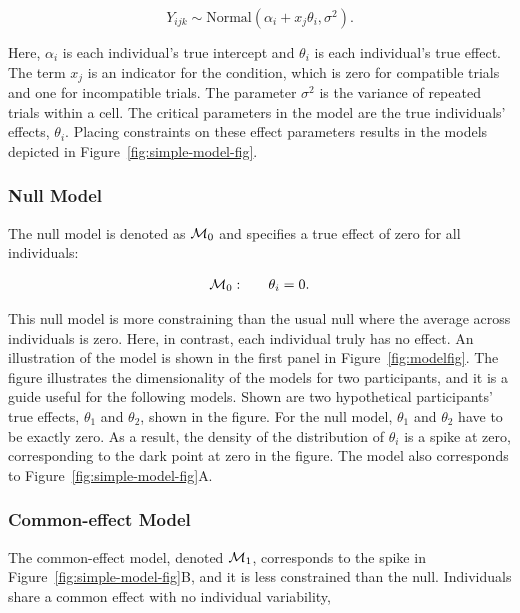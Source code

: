 \documentclass[english,man]{apa6}
\theoremstyle{definition}
\theoremstyle{definition}
\theoremstyle{remark}
\begin{document}
\begin{equation}\label{basemodel}
Y_{ijk} \sim \mbox{Normal}(\alpha_i + x_j\theta_i, \sigma^2).
\end{equation}

Here, \(\alpha_i\) is each individual's true intercept and \(\theta_i\)
is each individual's true effect. The term \(x_j\) is an indicator for
the condition, which is zero for compatible trials and one for
incompatible trials. The parameter \(\sigma^2\) is the variance of
repeated trials within a cell. The critical parameters in the model are
the true individuals' effects, \(\theta_i\). Placing constraints on
these effect parameters results in the models depicted in
Figure~\ref{fig:simple-model-fig}.

\subsubsection{Null Model}\label{null-model}

The null model is denoted as \({\cal M}_0\) and specifies a true effect of
zero for all individuals:

\[
  \begin{array}{llr}
{\cal M}_0: && \theta_i = 0.\\
\end{array}
\]

This null model is more constraining than the usual null where the
average across individuals is zero. Here, in contrast, each individual
truly has no effect. An illustration of the model is shown in the first
panel in Figure~\ref{fig:modelfig}. The figure illustrates the
dimensionality of the models for two participants, and it is a guide
useful for the following models. Shown are two hypothetical
participants' true effects, \(\theta_1\) and \(\theta_2\), shown in the
figure. For the null model, \(\theta_1\) and \(\theta_2\) have to be
exactly zero. As a result, the density of the distribution of
\(\theta_i\) is a spike at zero, corresponding to the dark point at zero
in the figure. The model also corresponds to
Figure~\ref{fig:simple-model-fig}A.

\subsubsection{Common-effect Model}\label{common-effect-model}

The common-effect model, denoted \({\cal M}_1\), corresponds to the spike
in Figure~\ref{fig:simple-model-fig}B, and it is less constrained than
the null. Individuals share a common effect with no individual
variability,
\end{document}
